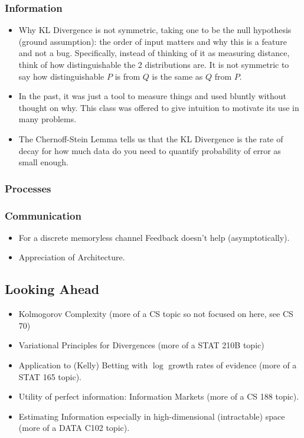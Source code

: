 \subsubsection{Information}
\begin{itemize}
    \item Why KL Divergence is not symmetric, taking one to be the null hypothesis (ground assumption): the order of input matters and why this is a feature and not a bug. Specifically, instead of thinking of it as measuring distance, think of how distinguishable the 2 distributions are. It is not symmetric to say how distinguishable $P$ is from $Q$ is the same as $Q$ from $P$.
    \item In the past, it was just a tool to measure things and used bluntly without thought on why. This class was offered to give intuition to motivate its use in many problems.
    \item The Chernoff-Stein Lemma tells us that the KL Divergence is the rate of decay for how much data do you need to quantify probability of error as small enough.
\end{itemize}

\subsubsection{Processes}
\subsubsection{Communication}
\begin{itemize}
    \item For a discrete memoryless channel Feedback doesn't help (asymptotically).
    \item Appreciation of Architecture.
\end{itemize}

\subsection{Looking Ahead}
\begin{itemize}
    \item Kolmogorov Complexity (more of a CS topic so not focused on here, see CS 70)
    \item Variational Principles for Divergences (more of a STAT 210B topic)
    \item Application to (Kelly) Betting with $\log$ growth rates of evidence (more of a STAT 165 topic).
    \item Utility of perfect information: Information Markets (more of a CS 188 topic).
    \item Estimating Information especially in high-dimensional (intractable) space (more of a DATA C102 topic).
\end{itemize}
